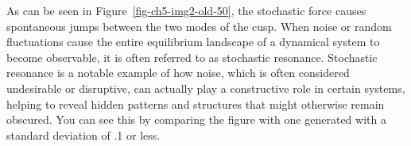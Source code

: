 \documentclass[
  letterpaper,
]{scrbook}
\newenvironment{Shaded}{\begin{snugshade}}{\end{snugshade}}
\newcommand{\AttributeTok}[1]{\textcolor[rgb]{0.40,0.45,0.13}{#1}}
\newcommand{\DecValTok}[1]{\textcolor[rgb]{0.68,0.00,0.00}{#1}}
\newcommand{\FunctionTok}[1]{\textcolor[rgb]{0.28,0.35,0.67}{#1}}
\newcommand{\NormalTok}[1]{\textcolor[rgb]{0.00,0.23,0.31}{#1}}
\newcommand{\OtherTok}[1]{\textcolor[rgb]{0.00,0.23,0.31}{#1}}
\newcommand{\SpecialCharTok}[1]{\textcolor[rgb]{0.37,0.37,0.37}{#1}}
\newcommand{\StringTok}[1]{\textcolor[rgb]{0.13,0.47,0.30}{#1}}
\begin{document}
As can be seen in Figure~\ref{fig-ch5-img2-old-50}, the stochastic force
causes spontaneous jumps between the two modes of the cusp. When noise
or random fluctuations cause the entire equilibrium landscape of a
dynamical system to become observable, it is often referred to as
stochastic resonance. Stochastic resonance is a notable example of how
noise, which is often considered undesirable or disruptive, can actually
play a constructive role in certain systems, helping to reveal hidden
patterns and structures that might otherwise remain obscured. You can
see this by comparing the figure with one generated with a standard
deviation of .1 or less.

\begin{Shaded}
\end{Shaded}
\end{document}
